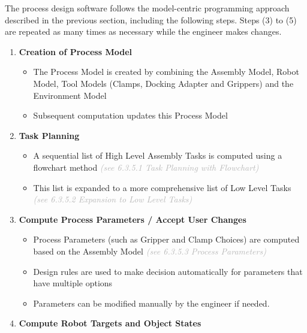 The process design software follows the model-centric programming approach described in the previous section, including the following steps. Steps (3) to (5) are repeated as many times as necessary while the engineer makes changes.
\begin{enumerate}
\item \textbf{Creation of Process Model}

\begin{itemize}
	\item The Process Model is created by combining the Assembly Model, Robot Model, Tool Models (Clamps, Docking Adapter and Grippers) and the Environment Model 

	\item Subsequent computation updates this Process Model

\end{itemize}

\item \textbf{Task Planning}

\begin{itemize}
	\item A sequential list of High Level Assembly Tasks is computed using a flowchart method \textit{\textcolor[HTML]{B7B7B7}{(see 6.3.5.1 Task Planning with Flowchart)}}

	\item This list is expanded to a more comprehensive list of Low Level Tasks \textit{\textcolor[HTML]{B7B7B7}{(see 6.3.5.2 Expansion to Low Level Tasks)}}

\end{itemize}
	\item \textbf{Compute Process Parameters / Accept User Changes}

\begin{itemize}
	\item Process Parameters (such as Gripper and Clamp Choices) are computed based on the Assembly Model \textit{\textcolor[HTML]{B7B7B7}{(see 6.3.5.3 Process Parameters)}}

	\item Design rules are used to make decision automatically for parameters that have multiple options

	\item Parameters can be modified manually by the engineer if needed.

\end{itemize}
	\item \textbf{Compute Robot Targets and Object States}


\end{enumerate}
